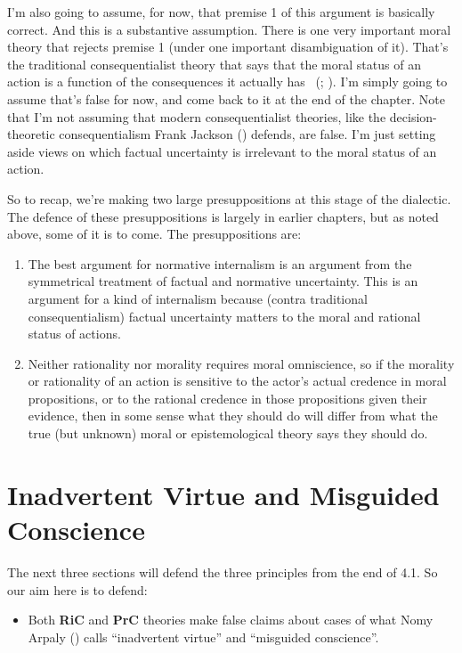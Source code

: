 \documentclass[
  10pt,
  letterpaper,
  twoside]{scrbook}
\providecommand{\tightlist}{%
  \setlength{\itemsep}{0pt}\setlength{\parskip}{0pt}}\usepackage{longtable,booktabs,array}
\begin{document}
I'm also going to assume, for now, that premise 1 of this argument is
basically correct. And this is a substantive assumption. There is one
very important moral theory that rejects premise 1 (under one important
disambiguation of it). That's the traditional consequentialist theory
that says that the moral status of an action is a function of the
consequences it actually has ~(; ). I'm simply going to assume
that's false for now, and come back to it at the end of the chapter.
Note that I'm not assuming that modern consequentialist theories, like
the decision-theoretic consequentialism {Frank} Jackson
() defends, are false. I'm just setting
aside views on which factual uncertainty is irrelevant to the moral
status of an action.

So to recap, we're making two large presuppositions at this stage of the
dialectic. The defence of these presuppositions is largely in earlier
chapters, but as noted above, some of it is to come. The presuppositions
are:

\begin{enumerate}
\def\labelenumi{\arabic{enumi}.}
\tightlist
\item
  The best argument for normative internalism is an argument from the
  symmetrical treatment of factual and normative uncertainty. This is an
  argument for a kind of internalism because (contra traditional
  consequentialism) factual uncertainty matters to the moral and
  rational status of actions.
\item
  Neither rationality nor morality requires moral omniscience, so if the
  morality or rationality of an action is sensitive to the actor's
  actual credence in moral propositions, or to the rational credence in
  those propositions given their evidence, then in some sense what they
  should do will differ from what the true (but unknown) moral or
  epistemological theory says they should do.
\end{enumerate}

\section{Inadvertent Virtue and Misguided
Conscience}\label{inadvertentvirtueandmisguidedconscience}

The next three sections will defend the three principles from the end of
4.1. So our aim here is to defend:

\begin{itemize}
\tightlist
\item
  Both \textbf{RiC} and \textbf{PrC} theories make false claims about
  cases of what Nomy Arpaly () calls
  ``inadvertent virtue'' and ``misguided conscience''.
\end{itemize}
\end{document}
